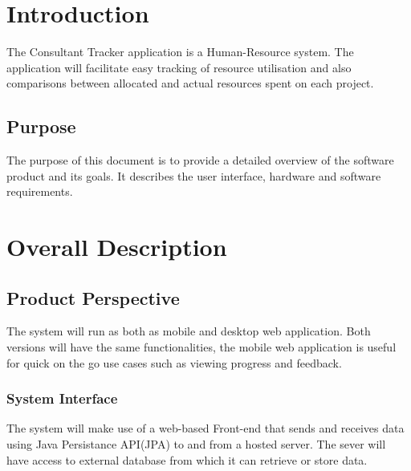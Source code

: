 \documentclass[a4paper, 12pt, oneside]{article}
\begin{document}
\newpage
\tableofcontents
\newpage



\section{Introduction}
The Consultant Tracker application is a Human-Resource system. The application will facilitate easy tracking of resource utilisation and also comparisons between allocated and actual resources spent on each project.
\subsection{Purpose}
The purpose of this document is to provide a detailed overview of the software product and its goals. It describes the user interface, hardware and software requirements.

\newpage
\section{Overall Description}
 
\subsection{Product Perspective}
The system will run as both as mobile and desktop web application. Both versions will have the same functionalities, the mobile web application is useful for quick on the go use cases such as viewing progress and feedback.
\subsubsection{System Interface}
The system will make use of a web-based Front-end that sends and receives data using Java Persistance API(JPA) to and from a hosted server.  The sever will have access to external database from which it can retrieve or store data.
\end{document}
